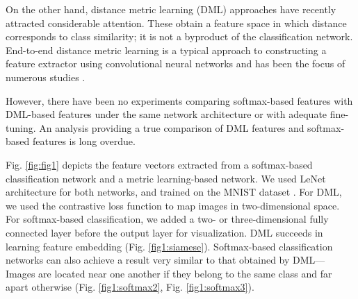 \documentclass[9pt,technote,compsoc]{./sty/IEEEtran}
\begin{document}
\begin{figure*}[h!]
	\centering
	\hfill
	\hfill
	\hfill
	\hfill
	\caption{Depiction of MNIST dataset. (a) Two-dimensional features obtained by siamese network. (b) Two-dimensional features extracted from softmax-based classifier; these features are well separated by angle but not by Euclidean norm. (c) Three-dimensional features extracted from softmax-based classifier; we normalized these to have unit L2 norm and depict them in an azimuth--elevation coordinate system. The three-dimensional features are well separated by their classes.}
	\label{fig:fig1}
\end{figure*}


On the other hand, distance metric learning (DML) approaches have recently attracted considerable attention.
These obtain a feature space in which distance corresponds to class similarity; it is not a byproduct of the classification network.
End-to-end distance metric learning is a typical approach to constructing a feature extractor using convolutional neural networks and has been the focus of numerous studies \cite{bell2015productnet,schroff2015facenet,song2016deep,sohn2016improved,song2017learnable}.

However, there have been no experiments comparing softmax-based features with DML-based features under the same network architecture or with adequate fine-tuning.
An analysis providing a true comparison of DML features and softmax-based features is long overdue.

Fig. \ref{fig:fig1} depicts the feature vectors extracted from a softmax-based classification network and a metric learning-based network.
We used LeNet architecture for both networks, and trained on the MNIST dataset \cite{lecun1998gradient}.
For DML, we used the contrastive loss function \cite{hadsell2006dimensionality} to map images in two-dimensional space.
For softmax-based classification, we added a two- or three-dimensional fully connected layer before the output layer for visualization.
DML succeeds in learning feature embedding (Fig. \ref{fig1:siamese}).
Softmax-based classification networks can also achieve a result very similar to that obtained by DML--- Images are located near one another if they belong to the same class and far apart otherwise (Fig. \ref{fig1:softmax2}, Fig. \ref{fig1:softmax3}).
\end{document}
